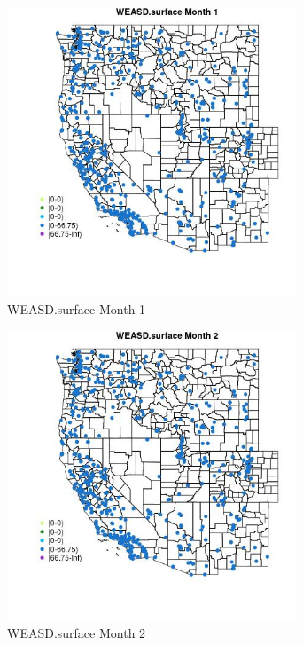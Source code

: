 \begin{figure} 
\centering  
\includegraphics[width=0.77\textwidth]{Code_Outputs/Report_ML_input_PM25_Step4_part_e_de_duplicated_aves_compiled_2019-05-14wNAs_MapObsMo1WEASDsurface.jpg} 
\caption{\label{fig:Report_ML_input_PM25_Step4_part_e_de_duplicated_aves_compiled_2019-05-14wNAsMapObsMo1WEASDsurface}WEASD.surface Month 1} 
\end{figure} 
 

\begin{figure} 
\centering  
\includegraphics[width=0.77\textwidth]{Code_Outputs/Report_ML_input_PM25_Step4_part_e_de_duplicated_aves_compiled_2019-05-14wNAs_MapObsMo2WEASDsurface.jpg} 
\caption{\label{fig:Report_ML_input_PM25_Step4_part_e_de_duplicated_aves_compiled_2019-05-14wNAsMapObsMo2WEASDsurface}WEASD.surface Month 2} 
\end{figure} 
 

